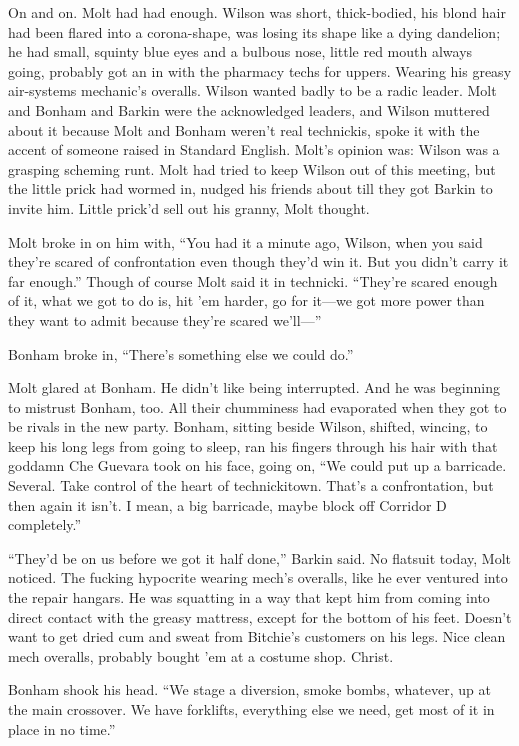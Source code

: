 On and on. Molt had had enough. Wilson was short, thick-bodied, his blond hair had been flared into a corona-shape, was losing its shape like a dying dandelion; he had small, squinty blue eyes and a bulbous nose, little red mouth always going, probably got an in with the pharmacy techs for uppers. Wearing his greasy air-systems mechanic's overalls. Wilson wanted badly to be a radic leader. Molt and Bonham and Barkin were the acknowledged leaders, and Wilson muttered about it because Molt and Bonham weren't real technickis, spoke it with the accent of someone raised in Standard English. Molt's opinion was: Wilson was a grasping scheming runt. Molt had tried to keep Wilson out of this meeting, but the little prick had wormed in, nudged his friends about till they got Barkin to invite him. Little prick'd sell out his granny, Molt thought.

Molt broke in on him with, ``You had it a minute ago, Wilson, when you said they're scared of confrontation even though they'd win it. But you didn't carry it far enough.'' Though of course Molt said it in technicki. ``They're scared enough of it, what we got to do is, hit 'em harder, go for it—we got more power than they want to admit because they're scared we'll—''

Bonham broke in, ``There's something else we could do.''

Molt glared at Bonham. He didn't like being interrupted. And he was beginning to mistrust Bonham, too. All their chumminess had evaporated when they got to be rivals in the new party. Bonham, sitting beside Wilson, shifted, wincing, to keep his long legs from going to sleep, ran his fingers through his hair with that goddamn Che Guevara took on his face, going on, ``We could put up a barricade. Several. Take control of the heart of technickitown. That's a confrontation, but then again it isn't. I mean, a big barricade, maybe block off Corridor D completely.''

``They'd be on us before we got it half done,'' Barkin said. No flatsuit today, Molt noticed. The fucking hypocrite wearing mech's overalls, like he ever ventured into the repair hangars. He was squatting in a way that kept him from coming into direct contact with the greasy mattress, except for the bottom of his feet. Doesn't want to get dried cum and sweat from Bitchie's customers on his legs. Nice clean mech overalls, probably bought 'em at a costume shop. Christ.

Bonham shook his head. ``We stage a diversion, smoke bombs, whatever, up at the main crossover. We have forklifts, everything else we need, get most of it in place in no time.''

